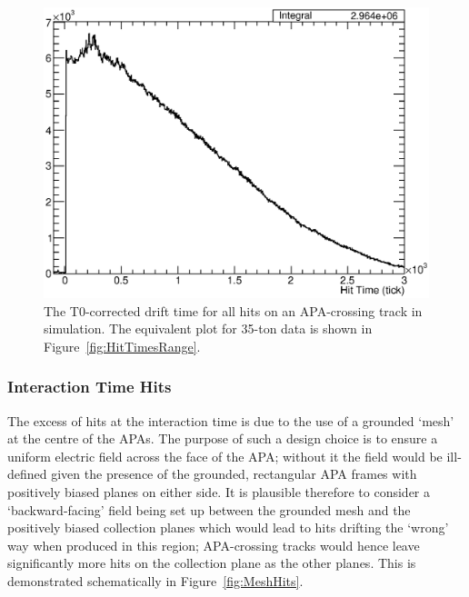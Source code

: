 \begin{figure}
  \centering
  \includegraphics[width=12cm]{HitTimesMC.eps}
  \caption[The T0-corrected drift time for all hits on an APA-crossing track in simulation.]{The T0-corrected drift time for all hits on an APA-crossing track in simulation.  The equivalent plot for 35-ton data is shown in Figure~\ref{fig:HitTimesRange}.}
  \label{fig:HitTimesMC}
\end{figure}

\subsubsection{Interaction Time Hits}\label{sec:InteractionTimeHits}

The excess of hits at the interaction time is due to the use of a grounded `mesh' at the centre of the APAs.  The purpose of such a design choice is to ensure a uniform electric field across the face of the APA; without it the field would be ill-defined given the presence of the grounded, rectangular APA frames with positively biased planes on either side.  It is plausible therefore to consider a `backward-facing' field being set up between the grounded mesh and the positively biased collection planes which would lead to hits drifting the `wrong' way when produced in this region; APA-crossing tracks would hence leave significantly more hits on the collection plane as the other planes.  This is demonstrated schematically in Figure~\ref{fig:MeshHits}.

